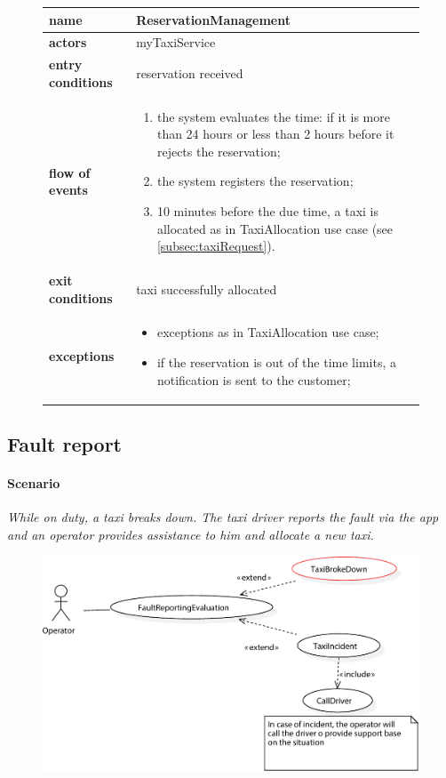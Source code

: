 \begin{figure}\begin{tabularx}{\textwidth}{ >{\bfseries}l X }\toprule%
	name				&	ReservationManagement%
	\\ \midrule%
	actors				&	myTaxiService%
	\\ \midrule%
	entry conditions	&	reservation received%
	\\ \midrule%
	flow of events		&	\begin{enumerate}%
		\item the system evaluates the time: if it is more than 24 hours or less than 2 hours before it rejects the reservation;%
		\item the system registers the reservation;%
		\item \num{10} minutes before the due time, a taxi is allocated as in TaxiAllocation use case (see \cref{subsec:taxiRequest}).%
	\end{enumerate} \\ \midrule%
	exit conditions		&	taxi successfully allocated%
	\\ \midrule%
	exceptions			&	\begin{itemize}%
		\item exceptions as in TaxiAllocation use case;%
		\item if the reservation is out of the time limits, a notification is sent to the customer;%
	\end{itemize} \\ \bottomrule%
\end{tabularx}\end{figure}


\subsection{Fault report}
\paragraph{Scenario}{\small\itshape While on duty, a taxi breaks down. The taxi driver reports the fault via the app and an operator provides assistance to him and allocate a new taxi.}


\begin{figure}%
	\includegraphics[width=\textwidth]{img/U_FaultReportingGLOBAL}%
\end{figure}


